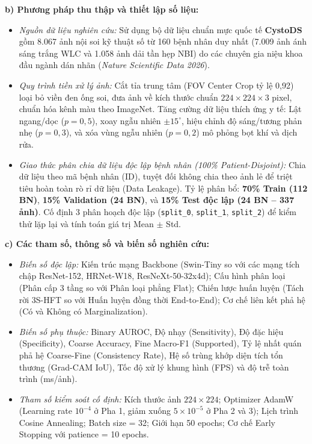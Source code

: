 \documentclass[a4paper]{article}
\begin{document}
\noindent\textbf{b) Phương pháp thu thập và thiết lập số liệu:}
\begin{itemize}
  \item \textit{Nguồn dữ liệu nghiên cứu:} Sử dụng bộ dữ liệu chuẩn mực quốc tế \textbf{CystoDS} gồm 8.067 ảnh nội soi kỹ thuật số từ 160 bệnh nhân duy nhất (7.009 ảnh ánh sáng trắng WLC và 1.058 ảnh dải tần hẹp NBI) do các chuyên gia niệu khoa đầu ngành dán nhãn (\textit{Nature Scientific Data 2026}).
  \item \textit{Quy trình tiền xử lý ảnh:} Cắt tỉa trung tâm (FOV Center Crop tỷ lệ 0,92) loại bỏ viền đen ống soi, đưa ảnh về kích thước chuẩn $224 \times 224 \times 3$ pixel, chuẩn hóa kênh màu theo ImageNet. Tăng cường dữ liệu thích ứng y tế: Lật ngang/dọc ($p=0,5$), xoay ngẫu nhiên $\pm 15^\circ$, hiệu chỉnh độ sáng/tương phản nhẹ ($p=0,3$), và xóa vùng ngẫu nhiên ($p=0,2$) mô phỏng bọt khí và dịch rửa.
  \item \textit{Giao thức phân chia dữ liệu độc lập bệnh nhân (100\% Patient-Disjoint):} Chia dữ liệu theo mã bệnh nhân (ID), tuyệt đối không chia theo ảnh lẻ để triệt tiêu hoàn toàn rò rỉ dữ liệu (Data Leakage). Tỷ lệ phân bổ: \textbf{70\% Train (112 BN)}, \textbf{15\% Validation (24 BN)}, và \textbf{15\% Test độc lập (24 BN -- 337 ảnh)}. Cố định 3 phân hoạch độc lập (\texttt{split\_0}, \texttt{split\_1}, \texttt{split\_2}) để kiểm thử lặp lại và tính toán giá trị Mean $\pm$ Std.
\end{itemize}

\noindent\textbf{c) Các tham số, thông số và biến số nghiên cứu:}
\begin{itemize}
  \item \textit{Biến số độc lập:} Kiến trúc mạng Backbone (Swin-Tiny so với các mạng tích chập ResNet-152, HRNet-W18, ResNeXt-50-32x4d); Cấu hình phân loại (Phân cấp 3 tầng so với Phân loại phẳng Flat); Chiến lược huấn luyện (Tách rời 3S-HFT so với Huấn luyện đồng thời End-to-End); Cơ chế liên kết phả hệ (Có và Không có Marginalization).
  \item \textit{Biến số phụ thuộc:} Binary AUROC, Độ nhạy (Sensitivity), Độ đặc hiệu (Specificity), Coarse Accuracy, Fine Macro-F1 (Supported), Tỷ lệ nhất quán phả hệ Coarse-Fine (Consistency Rate), Hệ số trùng khớp diện tích tổn thương (Grad-CAM IoU), Tốc độ xử lý khung hình (FPS) và độ trễ toàn trình (ms/ảnh).
  \item \textit{Tham số kiểm soát cố định:} Kích thước ảnh $224 \times 224$; Optimizer AdamW (Learning rate $10^{-4}$ ở Pha 1, giảm xuống $5 \times 10^{-5}$ ở Pha 2 và 3); Lịch trình Cosine Annealing; Batch size = 32; Giới hạn 50 epochs; Cơ chế Early Stopping với patience = 10 epochs.
\end{itemize}
\end{document}
